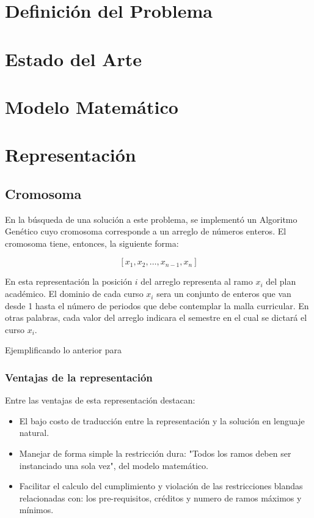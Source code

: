 \documentclass[letter, 10pt]{article}
\begin{document}
\section{Definición del Problema}

\section{Estado del Arte}

\section{Modelo Matemático}


\section{Representación}
\subsection{Cromosoma}
En la búsqueda de una solución a este problema, se implementó un Algoritmo
Genético cuyo cromosoma corresponde a un arreglo de números enteros. El
cromosoma tiene, entonces, la siguiente forma:

$$
	[x_{1},x_{2}, \dots ,x_{n-1},x_{n}]
$$

En esta representación la posición $i$ del arreglo representa al ramo $x_{i}$
del plan académico. El dominio de cada curso $x_{i}$ sera un conjunto de enteros
que van desde 1 hasta el número de periodos que debe contemplar la malla
curricular. En otras palabras, cada valor del arreglo indicara el semestre en el
cual se dictará el curso $x_{i}$.

Ejemplificando lo anterior para 

\subsubsection{Ventajas de la representación}
Entre las ventajas de esta representación destacan:
\begin{itemize}
	\item El bajo costo de traducción entre la representación y la solución
          en lenguaje natural.
	\item Manejar de forma simple la restricción dura: "Todos los ramos
          deben ser instanciado una sola vez", del modelo matemático.
	\item Facilitar el calculo del cumplimiento y violación de las
          restricciones blandas relacionadas con: los pre-requisitos, créditos y
          numero de ramos máximos y mínimos.
\end{itemize}
\end{document}
